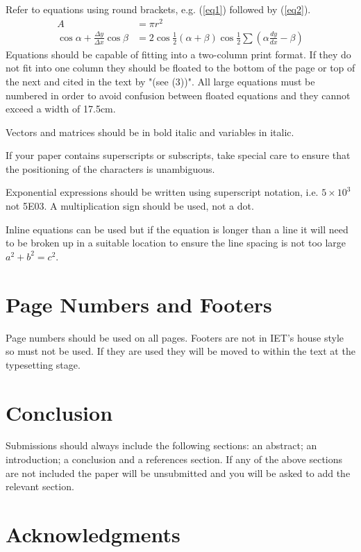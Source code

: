 \documentclass{cta-author}
\begin{document}
\setcounter{equation}{0}

Refer to equations using round brackets, e.g. (\ref{eq1})
followed by (\ref{eq2}).
\begin{align}
A & = \pi r^2 \label{eq1}\\
\cos \alpha +\frac{\Delta y}{\Delta x}\cos \beta & =2\cos
\frac{1}{2}\left( {\alpha +\beta } \right)\cos \frac{1}{2} \sum
\left({\alpha \frac{dy}{dx}-\beta}\right)\label{eq2}
\end{align}
Equations should be capable of fitting into a two-column
print format. If they do not fit into one column they
should be floated to the bottom of the page or top of the
next and cited in the text by "(see (3))". All large
equations must be numbered in order to avoid confusion
between floated equations and they cannot exceed a width of
17.5cm.

Vectors and matrices should be in bold italic and variables
in italic.

If your paper contains superscripts or subscripts, take
special care to ensure that the positioning of the
characters is unambiguous.

Exponential expressions should be written using superscript
notation, i.e. $5 \times 10^{3}$ not 5E03. A multiplication
sign should be used, not a dot.

Inline equations can be used but if the equation is longer
than a line it will need to be broken up in a suitable
location to ensure the line spacing is not too
large $a^2+b^2=c^2$.

\section{Page Numbers and Footers}\label{sec9}

Page numbers should be used on all pages. Footers are not
in IET's house style so must not be used. If they are used
they will be moved to within the text at the typesetting
stage.

\section{Conclusion}\label{sec10}

Submissions should always include the following sections:
an abstract; an introduction; a conclusion and a references
section. If any of the above sections are not included the
paper will be unsubmitted and you will be asked to add the
relevant section.

\section{Acknowledgments}\label{sec11}
\end{document}

